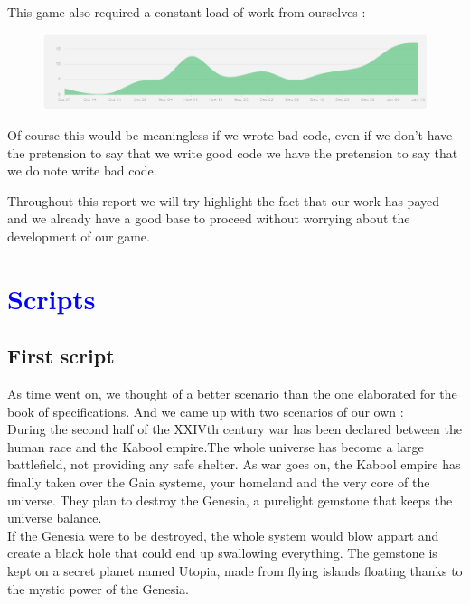\documentclass[article]{report} %
\begin{document}
			This game also required a constant load of work from ourselves : 
			\begin{figure}[h]
				\includegraphics[width=18cm]{images/Schemas/stats.png}
			\end{figure}

 			Of course this would be meaningless if we wrote bad code, even if we don't have the pretension to say that we write good code we have the pretension to say that  we do note write bad code.

 			Throughout this report we will try highlight the fact that our work has payed and we already have a good base to proceed without worrying about the development of our game.



								
  		\chapter{\textcolor{blue}{Scripts}}
			\section{First script}
				As time went on, we thought of a better scenario than the one elaborated for the book of specifications. 
				And we came up with two scenarios of our own : \\

				During the second half of the XXIVth century war has been declared between the human race and the Kabool empire.The whole universe 					has become a large battlefield, not providing any safe shelter. As war goes on, the Kabool empire has finally taken over the Gaia systeme, 					your homeland and the very core of the universe. They plan to destroy the Genesia, a purelight gemstone that keeps the universe balance.\\

				 If the Genesia were to be destroyed, the whole system would blow appart and create a black hole that could end up swallowing 						everything. The gemstone is kept on a secret planet named Utopia, made from flying islands floating thanks to the mystic power of the 					Genesia.\\
\end{document}
